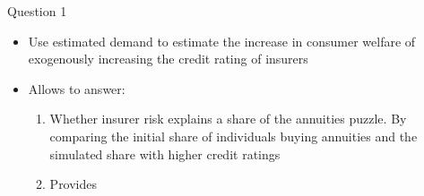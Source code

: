 \documentclass[10pt,aspectratio=169]{beamer}
\begin{document}
\begin{frame}{Question 1 }
    \begin{itemize}
    \item Use estimated demand to estimate the increase in consumer welfare of exogenously increasing the credit rating of insurers 
    \item Allows to answer: 
    \begin{enumerate}
        \item Whether insurer risk explains a share of the annuities puzzle. By comparing the initial share of individuals buying annuities and the simulated share with higher credit ratings
        
        \item  Provides 
    \end{enumerate}
    \end{itemize}
        
\end{frame}


 
\end{document}

